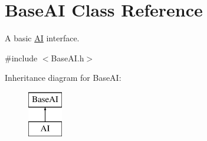 \hypertarget{classBaseAI}{
\section{BaseAI Class Reference}
\label{classBaseAI}
}


A basic \hyperlink{classAI}{AI} interface.  




{\ttfamily \#include $<$BaseAI.h$>$}

Inheritance diagram for BaseAI:\begin{figure}[H]
\begin{center}
\leavevmode
\includegraphics[height=2cm]{classBaseAI}
\end{center}
\end{figure}
